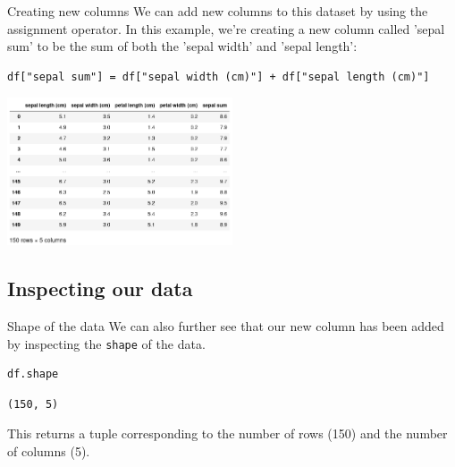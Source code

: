 \documentclass[10pt]{beamer}
\begin{document}
\begin{frame}[label={sec:org8625c08},fragile]{Creating new columns}
 We can add new columns to this dataset by using the assignment operator. In this
example, we're creating a new column called 'sepal sum' to be the sum of both
the 'sepal width' and 'sepal length':

\begin{verbatim}
df["sepal sum"] = df["sepal width (cm)"] + df["sepal length (cm)"]
\end{verbatim}

\begin{center}
\includegraphics[width=0.5\textwidth]{images/new-column.png}
\end{center}
\end{frame}

\subsection{Inspecting our data}
\label{sec:org02183ae}

\begin{frame}[label={sec:org290823c},fragile]{Shape of the data}
 We can also further see that our new column has been added by inspecting the
\texttt{shape} of the data.

\begin{verbatim}
df.shape
\end{verbatim}

\begin{verbatim}
(150, 5)
\end{verbatim}

This returns a tuple corresponding to the number of rows (150) and the number of
columns (5).
\end{frame}
\end{document}
